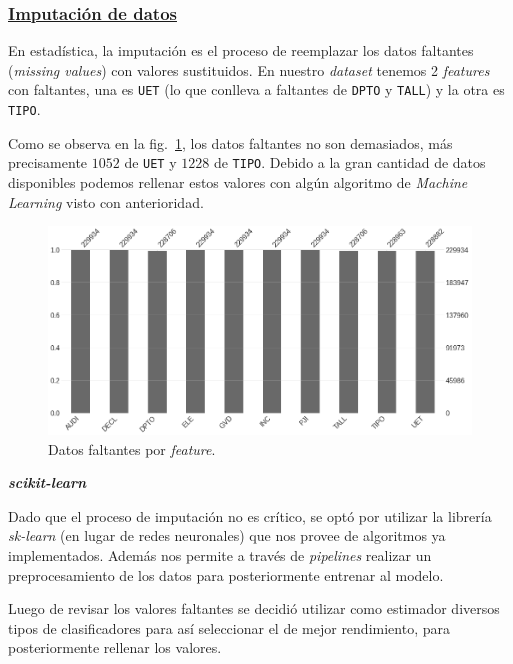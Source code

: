 \documentclass[a4paper,12pt]{article}
\begin{document}
\subsubsection{\href{https://github.com/GeraCollante/tesis-icomp-machinelearning/blob/main/DataImputation.ipynb}{\color{blue}Imputación de datos}}
 
En estadística, la imputación es el proceso de reemplazar los datos faltantes (\textit{missing values}) con valores sustituidos. En nuestro \textit{dataset} tenemos 2 \textit{features} con faltantes, una es \texttt{UET} (lo que conlleva a faltantes de \texttt{DPTO} y \texttt{TALL}) y la otra es \texttt{TIPO}.

Como se observa en la fig.~\ref{fig:missingvalue}, los datos faltantes no son demasiados, más precisamente $1052$ de \texttt{UET} y $1228$ de \texttt{TIPO}. Debido a la gran cantidad de datos disponibles podemos rellenar estos valores con algún algoritmo de \textit{Machine Learning} visto con anterioridad.

\begin{figure}[H]
	\begin{center}
	\includegraphics[width=1\textwidth]{tesis_66.png}
  	\caption{Datos faltantes por \textit{feature}.}
  	\label{fig:missingvalue}
  	\end{center}
\end{figure}

\textbf{\textit{scikit-learn}}

Dado que el proceso de imputación no es crítico, se optó por utilizar la librería \textit{sk-learn} (en lugar de redes neuronales) que nos provee de algoritmos ya implementados. Además nos permite a través de \textit{pipelines} realizar un preprocesamiento de los datos para posteriormente entrenar al modelo.

Luego de revisar los valores faltantes se decidió utilizar como estimador diversos tipos de clasificadores para así seleccionar el de mejor rendimiento, para posteriormente rellenar los valores.
\end{document}

